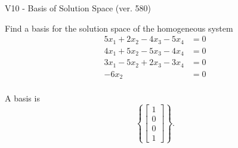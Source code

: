 \begin{exercise}
  \begin{exerciseTitle}V10 - Basis of Solution Space (ver. 580)\end{exerciseTitle}
  \begin{exerciseStatement}
    Find a basis for the solution space of the homogeneous system 
\begin{align*}
 5 x_ 1 + 2 x_ 2 -4 x_ 3 -5 x_ 4 &= 0  \\ 
  4 x_ 1 + 5 x_ 2 -5 x_ 3 -4 x_ 4 &= 0  \\ 
  3 x_ 1 -5 x_ 2 + 2 x_ 3 -3 x_ 4 &= 0  \\ 
  -6 x_ 2 &= 0  \\ 
 \end{align*}


 
  \end{exerciseStatement}

  \begin{exerciseAnswer}
   A basis is   
\[\left\{\left[\begin{array}{c}
1 \\
0 \\
0 \\
1
\end{array}\right]\right\}.\]

  


  \end{exerciseAnswer}
\end{exercise}
